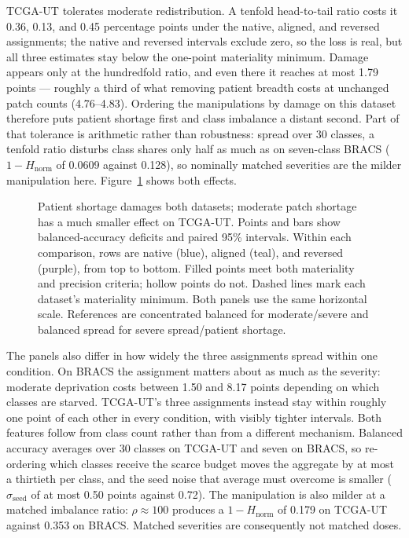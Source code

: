 \documentclass[11pt]{article}
\newcommand{\Hnorm}{1-H_{\mathrm{norm}}}
\begin{document}
TCGA-UT tolerates moderate redistribution. A tenfold head-to-tail ratio costs it \num{0.36}, \num{0.13}, and \num{0.45} percentage points under the native, aligned, and reversed assignments; the native and reversed intervals exclude zero, so the loss is real, but all three estimates stay below the one-point materiality minimum. Damage appears only at the hundredfold ratio, and even there it reaches at most \num{1.79} points --- roughly a third of what removing patient breadth costs at unchanged patch counts (\num{4.76}--\num{4.83}). Ordering the manipulations by damage on this dataset therefore puts patient shortage first and class imbalance a distant second. Part of that tolerance is arithmetic rather than robustness: spread over 30 classes, a tenfold ratio disturbs class shares only half as much as on seven-class BRACS ($\Hnorm$ of \num{0.0609} against \num{0.128}), so nominally matched severities are the milder manipulation here. Figure~\ref{fig:damage-overview} shows both effects.

\begin{figure}[ht]
\centering

\caption{Patient shortage damages both datasets; moderate patch shortage has a much smaller effect on TCGA-UT. Points and bars show balanced-accuracy deficits and paired 95\% intervals. Within each comparison, rows are native (blue), aligned (teal), and reversed (purple), from top to bottom. Filled points meet both materiality and precision criteria; hollow points do not. Dashed lines mark each dataset's materiality minimum. Both panels use the same horizontal scale. References are concentrated balanced for moderate/severe and balanced spread for severe spread/patient shortage.}
\label{fig:damage-overview}
\end{figure}

\noindent The panels also differ in how widely the three assignments spread within one condition. On BRACS the assignment matters about as much as the severity: moderate deprivation costs between \num{1.50} and \num{8.17} points depending on which classes are starved. TCGA-UT's three assignments instead stay within roughly one point of each other in every condition, with visibly tighter intervals. Both features follow from class count rather than from a different mechanism. Balanced accuracy averages over 30 classes on TCGA-UT and seven on BRACS, so re-ordering which classes receive the scarce budget moves the aggregate by at most a thirtieth per class, and the seed noise that average must overcome is smaller ($\sigma_{\mathrm{seed}}$ of at most \num{0.50} points against \num{0.72}). The manipulation is also milder at a matched imbalance ratio: $\rho\approx\num{100}$ produces a $\Hnorm$ of \num{0.179} on TCGA-UT against \num{0.353} on BRACS. Matched severities are consequently not matched doses.
\end{document}

